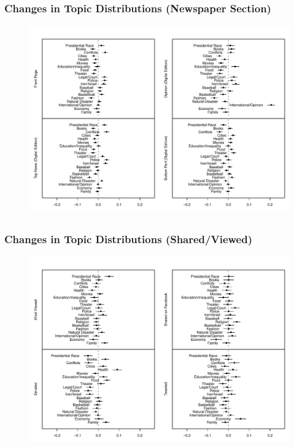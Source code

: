 \documentclass{beamer}
\begin{document}
\subsection{}
\begin{frame} %
  \frametitle{Changes in Topic Distributions (Newspaper Section)}
  \begin{figure}
  \includegraphics[width = .85\textwidth]{../calc/fig/res_nyt.pdf}
  \end{figure}
\end{frame}

\subsection{}
\begin{frame} %
  \frametitle{Changes in Topic Distributions (Shared/Viewed)}
  \begin{figure}
  \includegraphics[width = .85\textwidth]{../calc/fig/res_share.pdf}
  \end{figure}
\end{frame}
\end{document}
